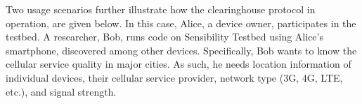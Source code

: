 

Two usage scenarios further illustrate how the clearinghouse 
protocol in operation, are given below. In this case, 
Alice, a device owner, participates in the testbed. A researcher, Bob, 
runs code on Sensibility Testbed using Alice's smartphone, discovered among other
devices. Specifically, Bob wants to know the cellular service
quality in major cities. As such, he needs location information
of individual devices, their cellular service provider, network
type (3G, 4G, LTE, etc.), and signal strength. 

